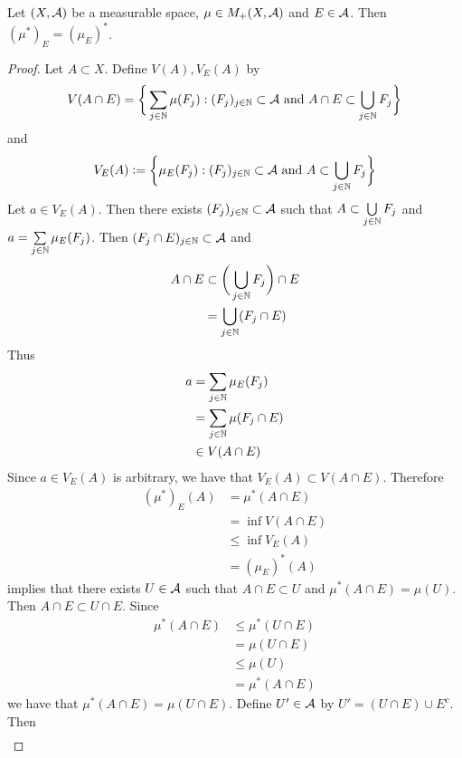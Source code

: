 \documentclass{book}
\begin{document}
	\begin{ex}  
		Let $(X, \mathcal{A})$ be a measurable space, $\mu \in M_+(X, \mathcal{A})$ and $E\in \mathcal{A}$. Then $(\mu^*)_E = (\mu_E)^*$. 
	\end{ex}
	
	\begin{proof}
		Let $A \subset X$. Define $V(A), V_E(A)$ by 
		$$V(A \cap E) = \bigg \{\sum_{j \in \mathbb{N}} \mu(F_j): (F_j)_{j \in \mathbb{N}} \subset \mathcal{A} \text{ and } A \cap E \subset \bigcup\limits_{j \in \mathbb{N}} F_j \bigg \}$$ 
		and 
		$$V_E(A) \vcentcolon=  \bigg \{\mu_E(F_j): (F_j)_{j \in \mathbb{N}} \subset \mathcal{A} \text{ and } A \subset \bigcup\limits_{j \in \mathbb{N}} F_j  \bigg\}$$
		Let $a \in V_E(A)$. Then there exists $(F_j)_{j \in \mathbb{N}} \subset \mathcal{A}$ such that $A \subset \bigcup\limits_{j \in \mathbb{N}} F_j$ and $a = \sum\limits_{j \in \mathbb{N}} \mu_E(F_j)$. Then $(F_j \cap E)_{j \in \mathbb{N}} \subset \mathcal{A}$ and 
		\begin{align*}
			A \cap E
			& \subset \bigg( \bigcup\limits_{j \in \mathbb{N}} F_j \bigg) \cap E \\
			& = \bigcup\limits_{j \in \mathbb{N}} (F_j  \cap E)
		\end{align*}
		Thus 
		\begin{align*}
			a
			& = \sum\limits_{j \in \mathbb{N}} \mu_E(F_j) \\
			& = \sum\limits_{j \in \mathbb{N}} \mu(F_j \cap E) \\
			& \in V(A \cap E) 
		\end{align*}
		Since $a \in V_E(A)$ is arbitrary, we have that $V_E(A) \subset V(A \cap E)$. Therefore
		\begin{align*}
			(\mu^*)_E(A)
			& = \mu^*(A \cap E) \\
			& = \inf V(A \cap E) \\
			& \leq \inf V_E(A) \\
			& = (\mu_E)^*(A)
		\end{align*}
		 implies that there exists $U \in \mathcal{A}$ such that $A \cap E \subset U$ and $\mu^*(A \cap E) = \mu(U)$. Then $A \cap E \subset U \cap E$. Since 
		\begin{align*}
			\mu^*(A \cap E)
			& \leq \mu^*(U \cap E) \\
			& = \mu(U \cap E) \\
			& \leq \mu(U) \\
			& = \mu^*(A \cap E)
		\end{align*} 
		we have that $\mu^*(A \cap E) = \mu(U \cap E)$. Define $U' \in \mathcal{A}$ by $U' = (U \cap E) \cup E^c$. Then 
		\begin{align*}

\end{align*}
\end{proof}
\end{document}

